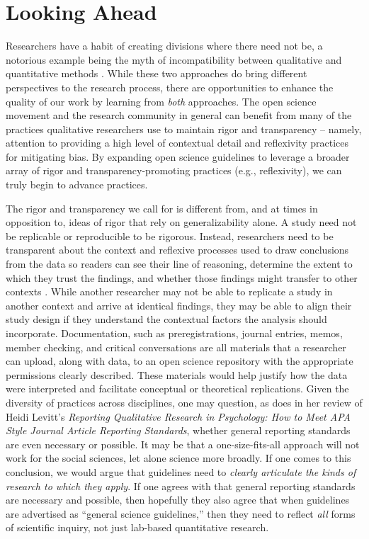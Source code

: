 \documentclass[authordate, meta]{jote-new-article}
\begin{document}
\section{Looking Ahead}



Researchers have a habit of creating divisions where there need not be, a notorious example being the myth of incompatibility between qualitative and quantitative methods \parencites{Ercikan2006}{Malterud2001}. While these two approaches do bring different perspectives to the research process, there are opportunities to enhance the quality of our work by learning from \emph{both }approaches. The open science movement and the research community in general can benefit from many of the practices qualitative researchers use to maintain rigor and transparency – namely, attention to providing a high level of contextual detail and reflexivity practices for mitigating bias. By expanding open science guidelines to leverage a broader array of rigor and transparency-promoting practices (e.g., reflexivity), we can truly begin to advance practices.



The rigor and transparency we call for is different from, and at times in opposition to, ideas of rigor that rely on generalizability alone. A study need not be replicable or reproducible to be rigorous. Instead, researchers need to be transparent about the context and reflexive processes used to draw conclusions from the data so readers can see their line of reasoning, determine the extent to which they trust the findings, and whether those findings might transfer to other contexts \parencites[e.g., trustworthiness;][]{Lincoln1985}. While another researcher may not be able to replicate a study in another context and arrive at identical findings, they may be able to align their study design if they understand the contextual factors the analysis should incorporate. Documentation, such as preregistrations, journal entries, memos, member checking, and critical conversations are all materials that a researcher can upload, along with data, to an open science repository with the appropriate permissions clearly described. These materials would help justify how the data were interpreted and facilitate conceptual or theoretical replications. Given the diversity of practices across disciplines, one may question, as \textcite{Clarke2022} does in her review of Heidi Levitt’s \emph{Reporting Qualitative Research in Psychology: How to Meet APA Style Journal Article Reporting Standards}, whether general reporting standards are even necessary or possible. It may be that a one-size-fits-all approach will not work for the social sciences, let alone science more broadly. If one comes to this conclusion, we would argue that guidelines need to \emph{clearly articulate the kinds of research to which they apply}. If one agrees with \textcite{Levitt2020} that general reporting standards are necessary and possible, then hopefully they also agree that when guidelines are advertised as “general science guidelines,” then they need to reflect \emph{all }forms of scientific inquiry, not just lab-based quantitative research.
\end{document}
